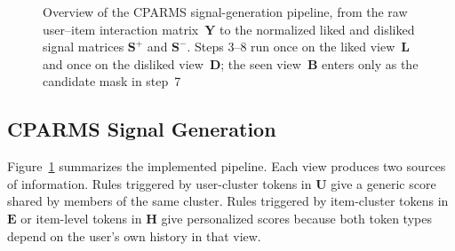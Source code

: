 \documentclass[pdflatex,sn-vancouver-num]{sn-jnl}%
\theoremstyle{thmstyleone}%
\theoremstyle{thmstyletwo}%
\theoremstyle{thmstylethree}%
\begin{document}
\begin{figure}[t]
{%
}
\caption{Overview of the CPARMS signal-generation pipeline, from the raw user--item
interaction matrix~$\mathbf{Y}$ to the normalized liked and disliked signal matrices
$\mathbf{S}^{+}$ and $\mathbf{S}^{-}$. Steps 3--8 run once on the liked view~$\mathbf{L}$ and
once on the disliked view~$\mathbf{D}$; the seen view~$\mathbf{B}$ enters only as the candidate
mask in step~7}
\label{fig:cparms_pipeline}
\end{figure}

\subsection{CPARMS Signal Generation}

Figure~\ref{fig:cparms_pipeline} summarizes the implemented pipeline. Each view produces two sources of information. Rules triggered by user-cluster tokens in $\mathbf{U}$ give a generic score shared by members of the same cluster. Rules triggered by item-cluster tokens in $\mathbf{E}$ or item-level tokens in $\mathbf{H}$ give personalized scores because both token types depend on the user's own history in that view.
\end{document}

